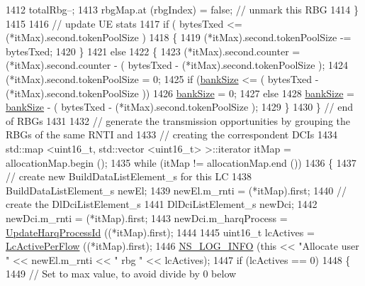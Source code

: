 \begin{DoxyCode}
1412           totalRbg--;
1413           rbgMap.at (rbgIndex) = \textcolor{keyword}{false};  \textcolor{comment}{// unmark this RBG}
1414         \}
1415 
1416         \textcolor{comment}{// update UE stats}
1417       \textcolor{keywordflow}{if} ( bytesTxed <= (*itMax).second.tokenPoolSize )
1418         \{
1419           (*itMax).second.tokenPoolSize -= bytesTxed;
1420         \}
1421       \textcolor{keywordflow}{else}
1422         \{
1423           (*itMax).second.counter = (*itMax).second.counter - ( bytesTxed -  (*itMax).second.tokenPoolSize 
      );
1424           (*itMax).second.tokenPoolSize = 0;
1425           \textcolor{keywordflow}{if} (\hyperlink{classns3_1_1FdTbfqFfMacScheduler_a2e499981c641859beb7ae48a0c343ba1}{bankSize} <= ( bytesTxed -  (*itMax).second.tokenPoolSize ))
1426             \hyperlink{classns3_1_1FdTbfqFfMacScheduler_a2e499981c641859beb7ae48a0c343ba1}{bankSize} = 0;
1427           \textcolor{keywordflow}{else} 
1428             \hyperlink{classns3_1_1FdTbfqFfMacScheduler_a2e499981c641859beb7ae48a0c343ba1}{bankSize} = \hyperlink{classns3_1_1FdTbfqFfMacScheduler_a2e499981c641859beb7ae48a0c343ba1}{bankSize} - ( bytesTxed -  (*itMax).second.tokenPoolSize );
1429         \}
1430     \} \textcolor{comment}{// end of RBGs}
1431 
1432   \textcolor{comment}{// generate the transmission opportunities by grouping the RBGs of the same RNTI and}
1433   \textcolor{comment}{// creating the correspondent DCIs}
1434   std::map <uint16\_t, std::vector <uint16\_t> >::iterator itMap = allocationMap.begin ();
1435   \textcolor{keywordflow}{while} (itMap != allocationMap.end ())
1436     \{
1437       \textcolor{comment}{// create new BuildDataListElement\_s for this LC}
1438       BuildDataListElement\_s newEl;
1439       newEl.m\_rnti = (*itMap).first;
1440       \textcolor{comment}{// create the DlDciListElement\_s}
1441       DlDciListElement\_s newDci;
1442       newDci.m\_rnti = (*itMap).first;
1443       newDci.m\_harqProcess = \hyperlink{classns3_1_1FdTbfqFfMacScheduler_a2e807a88411774f9552f3b394de16b57}{UpdateHarqProcessId} ((*itMap).first);
1444 
1445       uint16\_t lcActives = \hyperlink{classns3_1_1FdTbfqFfMacScheduler_a606f29c62ab153d6a584da5371070045}{LcActivePerFlow} ((*itMap).first);
1446       \hyperlink{group__logging_gafbd73ee2cf9f26b319f49086d8e860fb}{NS\_LOG\_INFO} (\textcolor{keyword}{this} << \textcolor{stringliteral}{"Allocate user "} << newEl.m\_rnti << \textcolor{stringliteral}{" rbg "} << lcActives);
1447       \textcolor{keywordflow}{if} (lcActives == 0)
1448         \{
1449           \textcolor{comment}{// Set to max value, to avoid divide by 0 below}

\end{DoxyCode}
